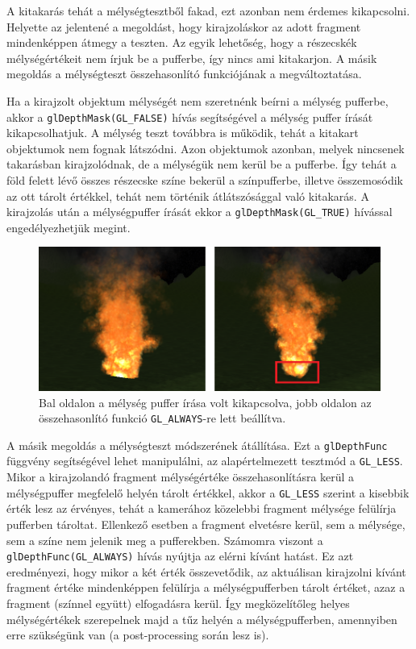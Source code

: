 A kitakarás tehát a mélységtesztből fakad, ezt azonban nem érdemes kikapcsolni. Helyette az jelentené a megoldást, hogy kirajzoláskor az adott fragment mindenképpen átmegy a teszten. Az egyik lehetőség, hogy a részecskék mélységértékeit nem írjuk be a pufferbe, így nincs ami kitakarjon. A másik megoldás a mélységteszt összehasonlító funkciójának a megváltoztatása.

Ha a kirajzolt objektum mélységét nem szeretnénk beírni a mélység pufferbe, akkor a \texttt{glDepthMask(GL\_FALSE)} hívás segítségével a mélység puffer írását kikapcsolhatjuk. A mélység teszt továbbra is működik, tehát a kitakart objektumok nem fognak látszódni. Azon objektumok azonban, melyek nincsenek takarásban kirajzolódnak, de a mélységük nem kerül be a pufferbe. Így tehát a föld felett lévő összes részecske színe bekerül a színpufferbe, illetve összemosódik az ott tárolt értékkel, tehát nem történik átlátszósággal való kitakarás. A kirajzolás után a mélységpuffer írását ekkor a \texttt{glDepthMask(GL\_TRUE)} hívással engedélyezhetjük megint.

\begin{figure}[h]
 \centering
 \includegraphics[width=\textwidth]{kepek/particleDepthComparison.png}
 \caption{Bal oldalon a mélység puffer írása volt kikapcsolva, jobb oldalon az összehasonlító funkció \texttt{GL\_ALWAYS}-re lett beállítva.}
 \label{fig:particleDepthComparison}
\end{figure}

A másik megoldás a mélységteszt módszerének átállítása. Ezt a \texttt{glDepthFunc} függvény segítségével lehet manipulálni, az alapértelmezett tesztmód a \texttt{GL\_LESS}. Mikor a kirajzolandó fragment mélységértéke összehasonlításra kerül a mélységpuffer megfelelő helyén tárolt értékkel, akkor a \texttt{GL\_LESS} szerint a kisebbik érték lesz az érvényes, tehát a kamerához közelebbi fragment mélysége felülírja pufferben tároltat. Ellenkező esetben a fragment elvetésre kerül, sem a mélysége, sem a színe nem jelenik meg a pufferekben. Számomra viszont a \texttt{glDepthFunc(GL\_ALWAYS)} hívás nyújtja az elérni kívánt hatást. Ez azt eredményezi, hogy mikor a két érték összevetődik, az aktuálisan kirajzolni kívánt fragment értéke mindenképpen felülírja a mélységpufferben tárolt értéket, azaz a fragment (színnel együtt) elfogadásra kerül. Így megközelítőleg helyes mélységértékek szerepelnek majd a tűz helyén a mélységpufferben, amennyiben erre szükségünk van (a post-processing során lesz is). 

